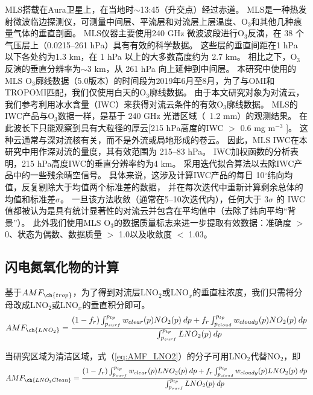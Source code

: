 MLS搭载在Aura卫星上，在当地时$\sim$13:45（升交点）经过赤道。
MLS是一种热发射微波临边探测仪，可测量中间层、平流层和对流层上层温度、O$_3$和其他几种痕量气体的垂直剖面。
MLS仪器主要使用240 GHz 微波波段进行O$_3$反演，在 38 个气压层上（0.0215--261 hPa）具有有效的科学数据。
这些层的垂直间距在1 hPa 以下各处约为1.3 km，在 1 hPa 以上的大多数高度约为 2.7 km。
相比之下，O$_3$反演的垂直分辨率为$\sim$3 km，从 261 hPa 向上延伸到中间层。
本研究中使用的MLS O$_3$廓线数据（5.0版本）的时间段为2019年6月至8月，为了与OMI和TROPOMI匹配，我们仅使用白天的O$_3$廓线数据。
由于本文研究对象为对流云，我们参考\citet{Livesey.2013}利用冰水含量（IWC）来获得对流云条件的有效O$_3$廓线数据。
MLS的IWC产品与O$_3$数据一样，是基于 240 GHz 光谱区域（~1.2 mm）的观测结果。
在此波长下只能观察到具有大粒径的厚云[215 hPa高度的IWC $>$ 0.6 mg m$^{-3}$ \citep{Wu.2008}]。 这种云通常与深对流核有关，而不是外流或局地形成的卷云。
因此，MLS IWC在本研究中用作深对流的量度，其有效范围为 215--83 hPa。
IWC加权函数的分析表明，215 hPa高度IWC的垂直分辨率约为4 km\citep{Wu.2008}。
\citet{Livesey.2013}采用迭代拟合算法以去除IWC产品中的一些残余晴空信号。
具体来说，这涉及计算IWC产品的每日 10$^{\circ}$纬向均值，反复剔除大于均值两个标准差的数据，
并在每次迭代中重新计算剩余总体的均值和标准差$\sigma$。
一旦该方法收敛（通常在5--10次迭代内），任何大于 3$\sigma$ 的 IWC值都被认为是具有统计显著性的对流云并包含在平均值中（去除了纬向平均“背景”）。
此外我们使用MLS O$_3$的数据质量标志来进一步提取有效数据：准确度 $>$ 0、状态为偶数、数据质量 $>$ 1.0以及收敛度 $<$ 1.03。


\subsection{闪电氮氧化物的计算} \label{sec:amf_definition}

基于$AMF_{\ch{trop}}$，为了得到对流层LNO$_2$或LNO$_x$的垂直柱浓度，我们只需将分母改成LNO$_2$或LNO$_x$的垂直积分即可。
\begin{equation} \label{eq:AMF_LNO2}
AMF_{\ch{LNO_2}} = \frac{(1-f_r) \int_{p_{surf}}^{p_{tp}} w_{clear}(p) NO_2(p) \: dp + f_r \int_{p_{cloud}}^{p_{tp}} w_{cloudy}(p) NO_2(p) \: dp}{\int_{p_{surf}}^{p_{tp}} LNO_2(p) \: dp}
\end{equation}

当研究区域为清洁区域，式（\ref{eq:AMF_LNO2}）的分子可用LNO$_2$代替NO$_2$，即
\begin{equation} \label{eq:AMF_LNO2clean}
AMF_{\ch{LNO_2Clean}} = \frac{(1-f_r) \int_{p_{surf}}^{p_{tp}} w_{clear}(p) LNO_2(p) \: dp + f_r \int_{p_{cloud}}^{p_{tp}} w_{cloudy}(p) LNO_2(p) \: dp}{\int_{p_{surf}}^{p_{tp}} LNO_2(p) \: dp}
\end{equation}

